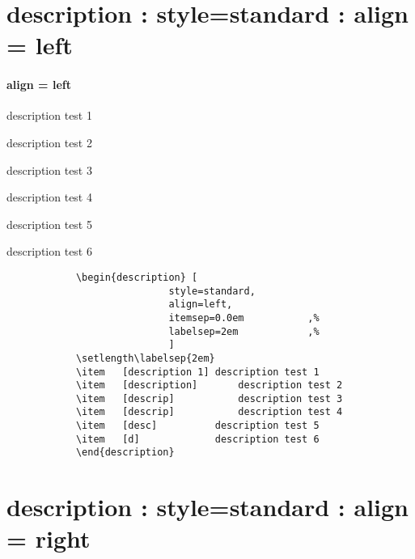 	\section{description : style=standard : align = left}
			\paragraph{ align = left }
			\begin{description}	[
							style=standard, 
							align=left,
							itemsep=0.0em 			,%
							labelsep=2em 			,%
							]
			\setlength{}
			\item	[description 1]	description test 1
			\item	[description]		description test 2
			\item	[descrip]			description test 3
			\item	[descrip]			description test 4
			\item	[desc]			description test 5
			\item	[d]				description test 6
			\end{description}


		\begin{mdframed}[style=code_document, frametitle={code}]
			\begin{verbatim}
			\begin{description}	[
							style=standard, 
							align=left,
							itemsep=0.0em 			,% 
							labelsep=2em 			,%
							]
			\setlength\labelsep{2em}
			\item	[description 1]	description test 1
			\item	[description]		description test 2
			\item	[descrip]			description test 3
			\item	[descrip]			description test 4
			\item	[desc]			description test 5
			\item	[d]				description test 6
			\end{description}
			\end{verbatim}
		\end{mdframed}



	\section{description : style=standard : align = right}


